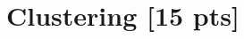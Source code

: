 \documentclass[a4paper,12pt,fleqn]{article}
\begin{document}
% 	
% 	

\clearpage
\section{Clustering [15 pts]}
\end{document}
